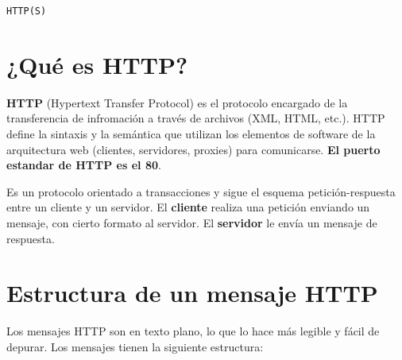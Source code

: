 \documentclass[a4paper,10pt]{article}
\begin{document}
\begin{center}
    {\Large \texttt{HTTP(S)}}\\
\end{center}

\tableofcontents
\newpage



\section{¿Qué es HTTP?}


\textbf{HTTP} (Hypertext Transfer Protocol) es el protocolo encargado de la transferencia de infromación a través de archivos (XML, HTML, etc.).
HTTP define la sintaxis y la semántica que utilizan los elementos de software de la arquitectura web (clientes, servidores, proxies) para comunicarse.
\textbf{El puerto estandar de HTTP es el 80}.
\

Es un protocolo orientado a transacciones y sigue el esquema petición-respuesta entre un cliente y un servidor. El \textbf{cliente}  
realiza una petición enviando un mensaje, con cierto formato al servidor. El \textbf{servidor} le envía un mensaje de respuesta.


\section{Estructura de un mensaje HTTP}

Los mensajes HTTP son en texto plano, lo que lo hace más legible y fácil de depurar. Los mensajes tienen la siguiente estructura:
\end{document}
